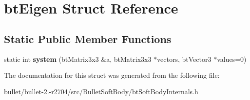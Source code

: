 \hypertarget{structbt_eigen}{\section{bt\+Eigen Struct Reference}
\label{structbt_eigen}
}
\subsection*{Static Public Member Functions}
\begin{DoxyCompactItemize}
\item 
\hypertarget{structbt_eigen_a494fdac32036151ec4cd7962ba74d068}{static int {\bfseries system} (bt\+Matrix3x3 \&a, bt\+Matrix3x3 $\ast$vectors, bt\+Vector3 $\ast$values=0)}\label{structbt_eigen_a494fdac32036151ec4cd7962ba74d068}

\end{DoxyCompactItemize}


The documentation for this struct was generated from the following file\+:\begin{DoxyCompactItemize}
\item 
bullet/bullet-\/2.-\/r2704/src/\+Bullet\+Soft\+Body/bt\+Soft\+Body\+Internals.\+h\end{DoxyCompactItemize}
